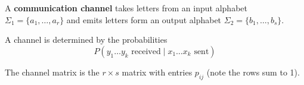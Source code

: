 \documentclass{article}
\begin{document}
A \textbf{communication channel} takes letters from an input alphabet $\Sigma_1 = \{a_1, \dotsc, a_r\}$ and emits letters form an output alphabet $\Sigma_2 = \{b_1, \dotsc, b_s\}$.

A channel is determined by the probabilities
\begin{equation*}
    P(y_1 \dotsc y_k \text{ received} \mid x_1 \dotsc x_k \text{ sent})
\end{equation*}


The channel matrix is the $r \times s$ matrix with entries $p_{ij}$ (note the rows sum to 1).
\end{document}

